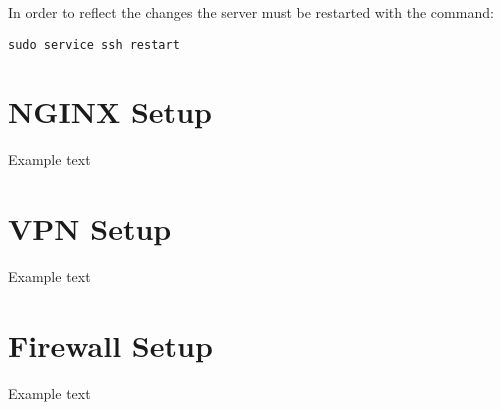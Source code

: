 \documentclass[10pt,a4paper]{article}
\begin{document}
In order to reflect the changes the server must be restarted with the command:
\begin{verbatim}
sudo service ssh restart
\end{verbatim}

\newpage
\section{NGINX Setup}
Example text

\newpage
\section{VPN Setup}
Example text

\newpage
\section{Firewall Setup}
Example text
\end{document}
